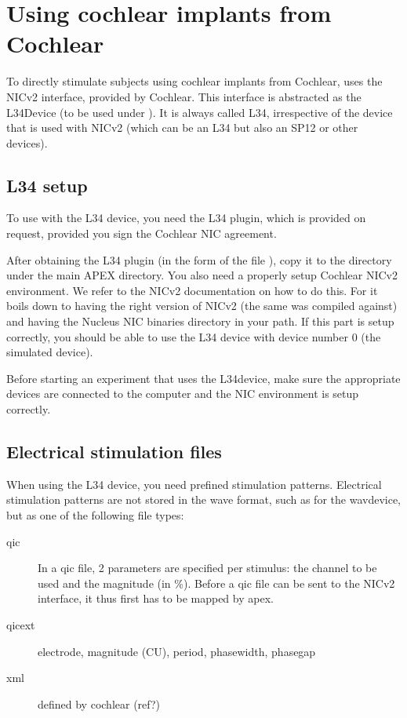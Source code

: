 \chapter{Using cochlear implants from Cochlear}
\label{sec:L34}

To directly stimulate subjects using cochlear implants from Cochlear, \apex uses the NICv2 interface, provided by Cochlear.
This interface is abstracted as the L34Device (to be used under ).
It is always called L34, irrespective of the device that is used
with NICv2 (which can be an L34 but also an SP12 or other devices).

\section{L34 setup}

To use \apex with the L34 device, you need the L34 plugin, which is provided on request, provided you sign the Cochlear NIC agreement.

After obtaining the L34 plugin (in the form of the file ), copy it to the  directory under the main APEX directory.
You also need a properly setup Cochlear NICv2 environment. We refer to the NICv2
documentation on how to do this. For \apex it boils down to having
the right version of NICv2 (the same \apex was compiled against)
and having the Nucleus NIC binaries directory in your path. If
this part is setup correctly, you should be able to use the L34
device with device number 0 (the simulated device).

Before starting an \apex experiment that uses the L34device, make sure the appropriate devices are connected to the computer and the NIC environment is setup correctly.


\section{Electrical stimulation files}

When using the L34 device, you need prefined stimulation patterns.
Electrical stimulation patterns are not stored in the wave format, such as for the wavdevice, but as one of the following file types:


\begin{description}
\item[qic] In a qic file, 2 parameters are specified per stimulus:
the channel to be used and the magnitude (in \%). Before a qic
file can be sent to the NICv2 interface, it thus first has to be
mapped by apex.
\item[qicext] electrode, magnitude (CU), period, phasewidth, phasegap
\item[xml] defined by cochlear (ref?)
\end{description}

